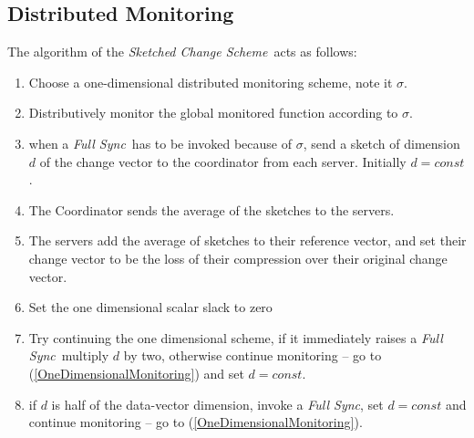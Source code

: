 \documentclass[10pt, conference]{IEEEtran}
\newcommand{\sketchScheme}{\textit{Sketched Change Scheme}}
\newcommand{\fullSync}{\textit{Full Sync}}
\begin{document}
\subsection{Distributed Monitoring}
The algorithm of the \sketchScheme \ acts as follows:
\begin{enumerate}
\item Choose a one-dimensional distributed monitoring scheme, note it $\sigma$.
\item \label{OneDimensionalMonitoring} Distributively monitor the global monitored function according to $\sigma$.
\item when a \fullSync \ has to be invoked because of $\sigma$, send a sketch of dimension $d$ of the change vector to the coordinator from each server. Initially $d = const$.
\item The Coordinator sends the average of the sketches to the servers.
\item The servers add the average of sketches to their reference vector, and set their change vector to be the loss of their compression over their original change vector.
\item \label{SetSlackToZero} Set the one dimensional scalar slack to zero
\item Try continuing the one dimensional scheme, if it immediately raises a \fullSync \ multiply $d$ by two, otherwise continue monitoring -- go to (\ref{OneDimensionalMonitoring}) and set $d = const$.
\item if $d$ is half of the data-vector dimension, invoke a \fullSync , set $d = const$ and continue monitoring -- go to (\ref{OneDimensionalMonitoring}).
\end{enumerate}
\end{document}
